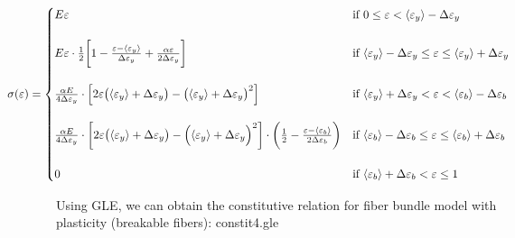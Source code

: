 \documentclass{article}
\newcommand{\eps}{\varepsilon}
\newcommand{\avg}[1]{\langle #1 \rangle}
\newcommand{\dey}{\Delta \varepsilon_y}
\newcommand{\deb}{\Delta \varepsilon_b}
\begin{document}
\begin{equation*}
\hspace*{-1.5cm}
\sigma(\eps) =
    \begin{cases} 
        E \eps 
        & \text{if } 0 \leq \eps < \avg{\eps_y} - \dey \\ \\
        E \eps \cdot \frac{1}{2} \bigg[ 1 - \frac{\eps - \avg{\eps_y}}{\dey} + \frac{\alpha \eps}{2 \dey} \bigg] 
        & \text{if } \avg{\eps_y} - \dey \leq \eps \leq \avg{\eps_y} + \dey \\ \\
        \frac{\alpha E}{4 \dey} \cdot \Bigl[ 2\eps \bigl( \avg{\eps_y} + \dey \bigr) - \bigl( \avg{\eps_y} + \dey \bigr)^2 \Bigr] 
        & \text{if } \avg{\eps_y} + \dey < \eps < \avg{\eps_b} - \deb \\ \\
        \frac{\alpha E}{4 \dey} \cdot \bigg[ 2\eps \bigl( \avg{\eps_y} + \dey \bigr) - \Bigl( \avg{\eps_y} + \dey \Bigr)^2 \bigg] \cdot \bigg( \frac{1}{2} - \frac{\eps - \avg{\eps_b}}{2 \deb} \bigg) 
        & \text{if } \avg{\eps_b} - \deb \leq \eps \leq \avg{\eps_b} + \deb \\ \\
        0 
        & \text{if } \avg{\eps_b} + \deb < \eps \leq 1
    \end{cases}
\end{equation*}

Using GLE, we can obtain the constitutive relation for fiber bundle model with plasticity (breakable fibers): constit4.gle
\end{document}

